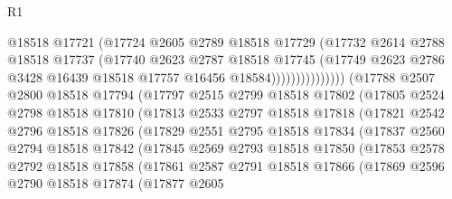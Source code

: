 \begin{lexlean}{R1}
\begin{coremodule}
                              @18518
                              @17721
                              (@17724
                                @2605
                                @2789
                                @18518
                                @17729
                                (@17732
                                  @2614
                                  @2788
                                  @18518
                                  @17737
                                  (@17740
                                    @2623
                                    @2787
                                    @18518
                                    @17745
                                    (@17749
                                      @2623
                                      @2786
                                      @3428
                                      @16439
                                      @18518
                                      @17757
                                      @16456
                                      @18584)))))))))))))))
        (@17788
          @2507
          @2800
          @18518
          @17794
          (@17797
            @2515
            @2799
            @18518
            @17802
            (@17805
              @2524
              @2798
              @18518
              @17810
              (@17813
                @2533
                @2797
                @18518
                @17818
                (@17821
                  @2542
                  @2796
                  @18518
                  @17826
                  (@17829
                    @2551
                    @2795
                    @18518
                    @17834
                    (@17837
                      @2560
                      @2794
                      @18518
                      @17842
                      (@17845
                        @2569
                        @2793
                        @18518
                        @17850
                        (@17853
                          @2578
                          @2792
                          @18518
                          @17858
                          (@17861
                            @2587
                            @2791
                            @18518
                            @17866
                            (@17869
                              @2596
                              @2790
                              @18518
                              @17874
                              (@17877
                                @2605

\end{coremodule}
\end{lexlean}

